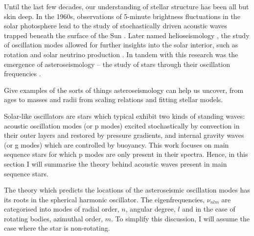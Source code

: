 Until the last few decades, our understanding of stellar structure has been all but skin deep. In the 1960s, observations of 5-minute brightness fluctuations in the solar photosphere lead to the study of stochastically driven acoustic waves trapped beneath the surface of the Sun \citep{Ulrich1970, Ando.Osaki1975}. Later named helioseismology \citep{Deubner.Gough1984}, the study of oscillation modes allowed for further insights into the solar interior, such as rotation \citep{Deubner.Ulrich.ea1979} and solar neutrino production \citep{Bahcall.Ulrich1988}. In tandem with this research was the emergence of asteroseismology -- the study of stars through their oscillation frequencies \citep{Christensen-Dalsgaard1984}.

Give examples of the sorts of things asteroseismology can help us uncover, from ages \citep[see, e.g.]{Ulrich1986, Soderblom2010, SilvaAguirre.Davies.ea2015} to masses and radii from scaling relations \citep{} and fitting stellar models\citep{}.

Solar-like oscillators are stars which typical exhibit two kinds of standing waves: acoustic oscillation modes (or p modes) excited stochastically by convection in their outer layers and restored by pressure gradients, and internal gravity waves (or g modes) which are controlled by buoyancy. This work focuses on main sequence stars for which p modes are only present in their spectra. Hence, in this section I will summarise the theory behind acoustic waves present in main sequence stars.

The theory which predicts the locations of the asteroseismic oscillation modes has its roots in the spherical harmonic oscillator. The eigenfrequencies, $\nu_{nlm}$ are categorised into modes of radial order, $n$, angular degree, $l$ and in the case of rotating bodies, azimuthal order, $m$. To simplify this discussion, I will assume the case where the star is non-rotating.


